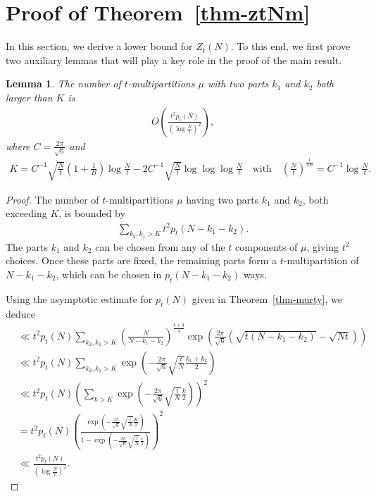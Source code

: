 \documentclass[11pt]{amsart}
\theoremstyle{plain}
\newtheorem{lemma}[theorem]{Lemma}
\numberwithin{equation}{section}
\begin{document}
	\section{Proof of Theorem~\ref{thm-ztNm}}
	In this section, we derive a lower bound for $Z_t(N)$. To this end, we first prove two auxiliary lemmas that will play a key role in the proof of the main result.
	\begin{lemma}\label{lemma-erdos}
		The number of $t$-multipartitions $\mu$ with two parts $k_1$ and $k_2$ both larger than $K$ is
		\begin{align*}
			O\left(\frac{t^{2}p_t(N)}{\left(\log \frac{N}{t}\right)^{2}}\right),  
		\end{align*}
		where $C=\frac{2\pi }{\sqrt{6}}$ and 
		\begin{align*}
			K= C^{-1}\sqrt{\frac{N}{t}}\left(1+\frac{1}{B}\right)\log \frac{N}{t}-2C^{-1}\sqrt{\frac{N}{t}}\log \log \log \frac{N}{t} \quad\text{with} \quad \left(\frac{N}{t}\right)^{\frac{1}{2B}}=C^{-1}\log \frac{N}{t}.
		\end{align*}
	\end{lemma}
	\begin{proof}
		The number of $t$-multipartitions $\mu$ having two parts $k_1$ and $k_2$, both exceeding $K$, is bounded by
		\begin{align*}
			\sum_{k_2,k_1>K}t^{2}p_t(N-k_1-k_2).
		\end{align*}
		The parts $k_1$ and $k_2$ can be chosen from any of the $t$ components of $\mu$, giving $t^2$ choices. Once these parts are fixed, the remaining parts form a $t$-multipartition of $N-k_1-k_2$, which can be chosen in $p_t(N-k_1-k_2)$ ways.
		
		Using the asymptotic estimate for $p_t(N)$ given in Theorem~\ref{thm-murty}, we deduce
		\begin{align*}
			&\ll t^{2}p_t(N)\sum_{k_2,k_1>K}\left(\frac{N}{N-k_1-k_2}\right)^{\frac{t+3}{4}}\exp\left(\frac{2\pi}{\sqrt{6}}\left(\sqrt{t(N-k_1-k_2)}-\sqrt{Nt}\right)\right)\\
			&\ll t^{2}p_t(N)\sum_{k_2,k_1>K}\exp\left(-\frac{2\pi}{\sqrt{6}}\sqrt{\frac{t}{N}}\frac{k_1+k_2}{2}\right)\\
			&\ll t^{2}p_t(N)\left(\sum_{k>K}\exp\left(-\frac{2\pi}{\sqrt{6}}\sqrt{\frac{t}{N}}\frac{k}{2}\right)\right)^{2}\\
			&=t^{2}p_t(N)\left(\frac{\exp\left(-\frac{2\pi}{\sqrt{6}}\sqrt{\frac{t}{N}}\frac{K}{2}\right)}{1-\exp\left(-\frac{2\pi}{\sqrt{6}}\sqrt{\frac{t}{N}}\frac{1}{2}\right)}\right)^{2}\\
			&\ll \frac{t^{2}p_t(N)}{\left(\log \frac{N}{t}\right)^{2}}.
		\end{align*}   
	\end{proof}
\end{document}
